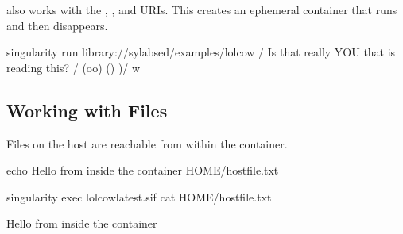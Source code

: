 \documentclass[letterpaper,10pt,english]{sphinxmanual}
\begin{document}
 also works with the , , and  URIs.
This creates an ephemeral container that runs and then disappears.

%
\begin{sphinxVerbatim}[commandchars=\\\{\}]
\PYGZdl{} singularity run library://sylabsed/examples/lolcow
 \PYGZus{}\PYGZus{}\PYGZus{}\PYGZus{}\PYGZus{}\PYGZus{}\PYGZus{}\PYGZus{}\PYGZus{}\PYGZus{}\PYGZus{}\PYGZus{}\PYGZus{}\PYGZus{}\PYGZus{}\PYGZus{}\PYGZus{}\PYGZus{}\PYGZus{}\PYGZus{}\PYGZus{}\PYGZus{}\PYGZus{}\PYGZus{}\PYGZus{}\PYGZus{}\PYGZus{}\PYGZus{}\PYGZus{}\PYGZus{}\PYGZus{}\PYGZus{}\PYGZus{}\PYGZus{}\PYGZus{}\PYGZus{}
/ Is that really YOU that is reading \PYGZbs{}
\PYGZbs{} this?                              /
 \PYGZhy{}\PYGZhy{}\PYGZhy{}\PYGZhy{}\PYGZhy{}\PYGZhy{}\PYGZhy{}\PYGZhy{}\PYGZhy{}\PYGZhy{}\PYGZhy{}\PYGZhy{}\PYGZhy{}\PYGZhy{}\PYGZhy{}\PYGZhy{}\PYGZhy{}\PYGZhy{}\PYGZhy{}\PYGZhy{}\PYGZhy{}\PYGZhy{}\PYGZhy{}\PYGZhy{}\PYGZhy{}\PYGZhy{}\PYGZhy{}\PYGZhy{}\PYGZhy{}\PYGZhy{}\PYGZhy{}\PYGZhy{}\PYGZhy{}\PYGZhy{}\PYGZhy{}\PYGZhy{}
        \PYGZbs{}   \PYGZca{}\PYGZus{}\PYGZus{}\PYGZca{}
         \PYGZbs{}  (oo)\PYGZbs{}\PYGZus{}\PYGZus{}\PYGZus{}\PYGZus{}\PYGZus{}\PYGZus{}\PYGZus{}
            (\PYGZus{}\PYGZus{})\PYGZbs{}       )\PYGZbs{}/\PYGZbs{}
                \textbar{}\textbar{}\PYGZhy{}\PYGZhy{}\PYGZhy{}\PYGZhy{}w \textbar{}
                \textbar{}\textbar{}     \textbar{}\textbar{}
\end{sphinxVerbatim}


\subsection{Working with Files}
\label{\detokenize{quick_start:working-with-files}}
Files on the host are reachable from within the container.

%
\begin{sphinxVerbatim}[commandchars=\\\{\}]
\PYGZdl{} echo \PYGZdq{}Hello from inside the container\PYGZdq{} \PYGZgt{} \PYGZdl{}HOME/hostfile.txt

\PYGZdl{} singularity exec lolcow\PYGZus{}latest.sif cat \PYGZdl{}HOME/hostfile.txt

Hello from inside the container
\end{sphinxVerbatim}
\end{document}
